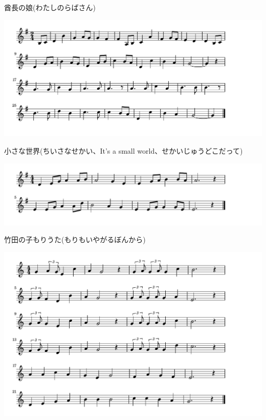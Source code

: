 \documentclass[a4paper]{ltjsarticle}
\begin{document}
\vspace{-10mm} \hspace{10mm}
酋長の娘(わたしのらばさん)




\includegraphics[clip]{smallworld_crop.pdf}

\vspace{-10mm} \hspace{10mm}
小さな世界(ちいさなせかい、It's a small world、せかいじゅうどこだって)



\includegraphics[clip]{takedanokomori_crop.pdf}

\vspace{-10mm} \hspace{10mm}
竹田の子もりうた(もりもいやがるぼんから)



\includegraphics[clip]{tonakai_crop.pdf}
\end{document}
